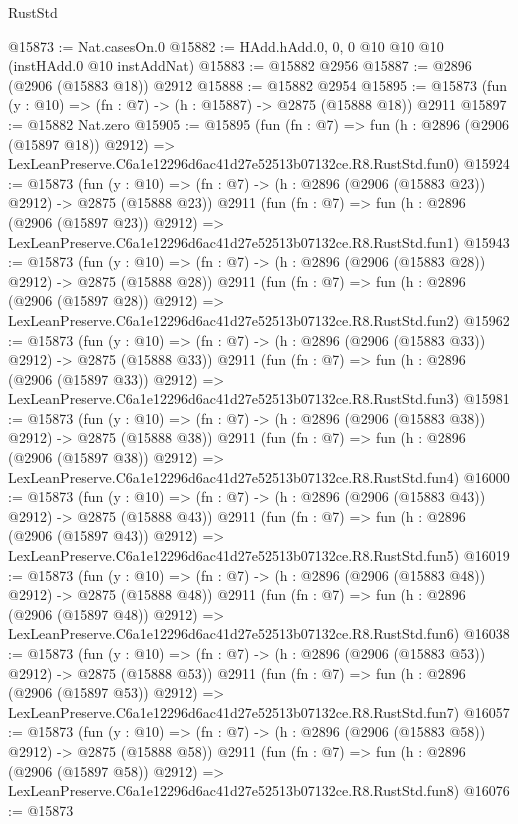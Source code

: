 \begin{lexlean}{RustStd}
\begin{coremodule}
@15873 := Nat.casesOn.{0}
@15882 := HAdd.hAdd.{0, 0, 0} @10 @10 @10 (instHAdd.{0} @10 instAddNat)
@15883 := @15882 @2956
@15887 := @2896 (@2906 (@15883 @18)) @2912
@15888 := @15882 @2954
@15895 := @15873 (fun (y : @10) => (fn : @7) -> (h : @15887) -> @2875 (@15888 @18)) @2911
@15897 := @15882 Nat.zero
@15905 := @15895
    (fun (fn : @7) =>
    fun (h : @2896 (@2906 (@15897 @18)) @2912) =>
    LexLeanPreserve.C6a1e12296d6ac41d27e52513b07132ce.R8.RustStd.fun0)
@15924 := @15873
    (fun (y : @10) => (fn : @7) -> (h : @2896 (@2906 (@15883 @23)) @2912) -> @2875 (@15888 @23))
    @2911
    (fun (fn : @7) =>
    fun (h : @2896 (@2906 (@15897 @23)) @2912) =>
    LexLeanPreserve.C6a1e12296d6ac41d27e52513b07132ce.R8.RustStd.fun1)
@15943 := @15873
    (fun (y : @10) => (fn : @7) -> (h : @2896 (@2906 (@15883 @28)) @2912) -> @2875 (@15888 @28))
    @2911
    (fun (fn : @7) =>
    fun (h : @2896 (@2906 (@15897 @28)) @2912) =>
    LexLeanPreserve.C6a1e12296d6ac41d27e52513b07132ce.R8.RustStd.fun2)
@15962 := @15873
    (fun (y : @10) => (fn : @7) -> (h : @2896 (@2906 (@15883 @33)) @2912) -> @2875 (@15888 @33))
    @2911
    (fun (fn : @7) =>
    fun (h : @2896 (@2906 (@15897 @33)) @2912) =>
    LexLeanPreserve.C6a1e12296d6ac41d27e52513b07132ce.R8.RustStd.fun3)
@15981 := @15873
    (fun (y : @10) => (fn : @7) -> (h : @2896 (@2906 (@15883 @38)) @2912) -> @2875 (@15888 @38))
    @2911
    (fun (fn : @7) =>
    fun (h : @2896 (@2906 (@15897 @38)) @2912) =>
    LexLeanPreserve.C6a1e12296d6ac41d27e52513b07132ce.R8.RustStd.fun4)
@16000 := @15873
    (fun (y : @10) => (fn : @7) -> (h : @2896 (@2906 (@15883 @43)) @2912) -> @2875 (@15888 @43))
    @2911
    (fun (fn : @7) =>
    fun (h : @2896 (@2906 (@15897 @43)) @2912) =>
    LexLeanPreserve.C6a1e12296d6ac41d27e52513b07132ce.R8.RustStd.fun5)
@16019 := @15873
    (fun (y : @10) => (fn : @7) -> (h : @2896 (@2906 (@15883 @48)) @2912) -> @2875 (@15888 @48))
    @2911
    (fun (fn : @7) =>
    fun (h : @2896 (@2906 (@15897 @48)) @2912) =>
    LexLeanPreserve.C6a1e12296d6ac41d27e52513b07132ce.R8.RustStd.fun6)
@16038 := @15873
    (fun (y : @10) => (fn : @7) -> (h : @2896 (@2906 (@15883 @53)) @2912) -> @2875 (@15888 @53))
    @2911
    (fun (fn : @7) =>
    fun (h : @2896 (@2906 (@15897 @53)) @2912) =>
    LexLeanPreserve.C6a1e12296d6ac41d27e52513b07132ce.R8.RustStd.fun7)
@16057 := @15873
    (fun (y : @10) => (fn : @7) -> (h : @2896 (@2906 (@15883 @58)) @2912) -> @2875 (@15888 @58))
    @2911
    (fun (fn : @7) =>
    fun (h : @2896 (@2906 (@15897 @58)) @2912) =>
    LexLeanPreserve.C6a1e12296d6ac41d27e52513b07132ce.R8.RustStd.fun8)
@16076 := @15873

\end{coremodule}
\end{lexlean}

